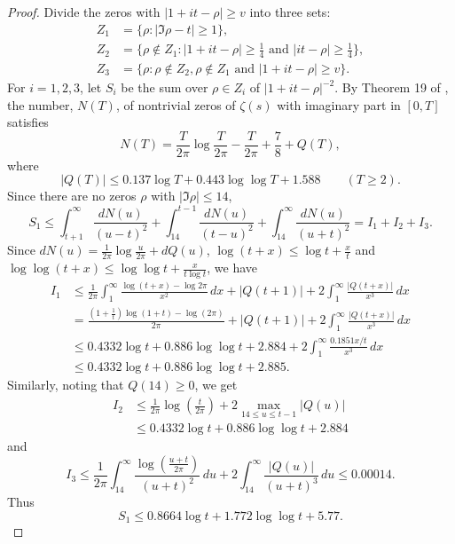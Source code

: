 \documentclass[10pt]{amsart}
\theoremstyle{remark}
\theoremstyle{plain}
\numberwithin{equation}{section}
\theoremstyle{definition}
\def\({\left(}
\def\){\right)}
\def\pfrac#1#2{\left(\frac{#1}{#2}\right)}
\begin{document}
\begin{proof}  Divide the zeros with $|1+it-\rho|\ge v$ into three sets:
\begin{align*} 
Z_1 &= \{ \rho: |\Im \rho - t| \ge 1 \}, \\
Z_2 &= \{ \rho \not\in Z_1: |1+it-\rho| \ge \tfrac14 \text{ and } 
    |it-\rho| \ge \tfrac14 \},\\
Z_3 &= \{ \rho: \rho \not\in Z_2, \rho\not\in Z_1\text{ and } |1+it-\rho|
    \ge v \}.
\end{align*}
For $i=1,2,3$, let $S_i$ be the sum over $\rho \in Z_i$ of $|1+it-\rho|^{-2}$.
By Theorem 19 of \cite{Ro}, the number, $N(T)$, of nontrivial
zeros of $\zeta(s)$ with imaginary part in $[0,T]$ satisfies
\begin{equation}
N(T) = \frac{T}{2\pi} \log \frac{T}{2\pi} - \frac{T}{2\pi} + \frac78 + Q(T),
\label{eq:N(T)}
\end{equation}
where
$$
|Q(T)| \le 0.137\log T + 0.443\log\log T + 1.588 \qquad (T\ge 2).
$$
Since there are no zeros $\rho$ with $|\Im \rho| \le 14$, 
$$
S_1 \le \int_{t+1}^\infty \frac{d N(u)}{(u-t)^2} +
 \int_{14}^{t-1} \frac{d N(u)}{(t-u)^2} +
 \int_{14}^{\infty} \frac{d N(u)}{(u+t)^2} =I_1 + I_2 + I_3.
$$
Since $dN(u)=\frac1{2\pi} \log \frac{u}{2\pi}+dQ(u)$,
$\log(t+x)\le \log t + \frac{x}{t}$ and $\log\log(t+x)\le \log\log t
+\frac{x}{t\log t}$, we have
\begin{align*}
I_1 &\le \frac{1}{2\pi} \int_1^\infty \frac{\log(t+x)-\log 2\pi}{x^2}\, dx + 
  |Q(t+1)| + 2\int_1^\infty \frac{|Q(t+x)|}{x^3}\, dx \\
&= \frac{\( 1 + \tfrac{1}{t} \) \log(1+t)-\log (2\pi)}{2\pi}
  + |Q(t+1)| + 2\int_1^\infty \frac{|Q(t+x)|}{x^3}\, dx \\
&\le 0.4332\log t + 0.886\log\log t + 2.884 +
  2\int_{1}^\infty \frac{0.1851x/t}{x^3}\, dx \\
&\le 0.4332\log t + 0.886\log\log t + 2.885.
\end{align*}
Similarly, noting that $Q(14) \ge 0$, we get
\begin{align*}
I_2 &\le \frac{1}{2\pi} \log\pfrac{t}{2\pi}+2\max_{14\le u\le t-1} |Q(u)| \\
& \le 0.4332\log t+ 0.886\log\log t + 2.884
\end{align*}
and
$$
I_3 \le \frac{1}{2\pi} \int_{14}^\infty \frac{\log\pfrac{u+t}{2\pi}}
{(u+t)^2}\, du + 2 \int_{14}^\infty \frac{|Q(u)|}{(u+t)^3} \, du 
\le 0.00014.
$$
Thus
\begin{equation}
S_1 \le 0.8664\log t + 1.772\log\log t+5.77.
\label{eq:S1}

\end{equation}
\end{proof}
\end{document}
